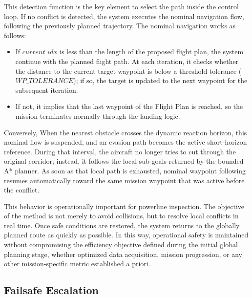 \documentclass[a4paper,11pt]{article}
\begin{document}
This detection function is the key element to select the path inside the control loop. If no conflict is detected, the system executes the nominal navigation flow, following the previously planned trajectory. The nominal navigation works as follows: 
\begin{itemize}
    \item If $current\_idx$ is less than the length of the proposed flight plan, the system continue with the planned flight path. At each iteration, it checks whether the distance to the current target waypoint is below a threshold tolerance ($WP\_TOLERANCE$); if so, the target is updated to the next waypoint for the subsequent iteration. 
    \item If not, it implies that the last waypoint of the Flight Plan is reached, so the mission terminates normally through the landing logic.
\end{itemize}

Conversely, When the nearest obstacle crosses the dynamic reaction horizon, this nominal flow is suspended, and an evasion path becomes the active short-horizon reference. During that interval, the aircraft no longer tries to cut through the original corridor; instead, it follows the local sub-goals returned by the bounded A* planner. As soon as that local path is exhausted, nominal waypoint following resumes automatically toward the same mission waypoint that was active before the conflict.

This behavior is operationally important for powerline inspection. The objective of the method is not merely to avoid collisions, but to resolve local conflicts in real time. Once safe conditions are restored, the system returns to the globally planned route as quickly as possible. In this way, operational safety is maintained without compromising the efficiency objective defined during the initial global planning stage, whether optimized data acquisition, mission progression, or any other mission-specific metric established a priori.


\subsection{Failsafe Escalation}
\end{document}
